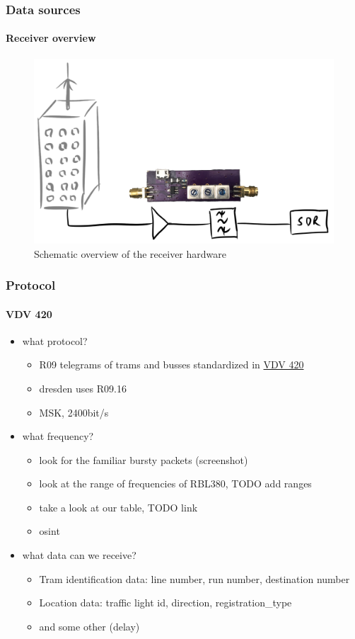 \documentclass[aspectratio=169]{beamer}
\begin{document}

\begin{frame}
\frametitle{Data sources}
\framesubtitle{Receiver overview}
\begin{figure}
\centering
\includegraphics[height=0.65\textheight]{figs/antenna-filter.pdf}
\caption{Schematic overview of the receiver hardware}
\end{figure}
\end{frame}


\begin{frame}
\frametitle{Protocol}
\framesubtitle{VDV 420}

	\begin{itemize}
		\item what protocol?
		\begin{itemize}
			\item R09 telegrams of trams and busses standardized in \href{https://knowhow.vdv.de/documents/420/}{VDV 420}
			\item dresden uses R09.16
			\item MSK, 2400bit/s
		\end{itemize}
		\item what frequency?
		\begin{itemize}
			\item look for the familiar bursty packets (screenshot)
			\item look at the range of frequencies of RBL380, TODO add ranges
			\item take a look at our table, TODO link
			\item osint
		\end{itemize}
		\item what data can we receive?
		\begin{itemize}
			\item Tram identification data: line number, run number, destination number
			\item Location data: traffic light id, direction, registration\_type
			\item and some other (delay)
		\end{itemize}
	\end{itemize}
\end{frame}
\end{document}
